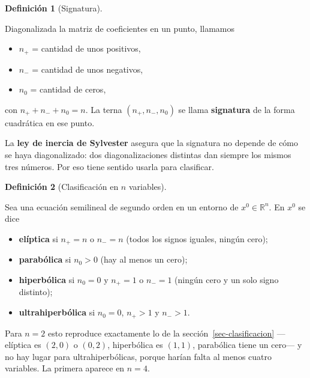 \documentclass[
  spanish,
  a4paper,
]{scrbook}
\providecommand{\tightlist}{%
  \setlength{\itemsep}{0pt}\setlength{\parskip}{0pt}}
\theoremstyle{definition}
\newtheorem{definition}{Definición}[chapter]
\theoremstyle{plain}
\theoremstyle{definition}
\theoremstyle{plain}
\theoremstyle{definition}
\theoremstyle{remark}
\begin{document}
\begin{definition}[Signatura]\protect\hypertarget{def-signatura}{}\label{def-signatura}

Diagonalizada la matriz de coeficientes en un punto, llamamos

\begin{itemize}
\tightlist
\item
  \(n_+\) = cantidad de unos positivos,
\item
  \(n_-\) = cantidad de unos negativos,
\item
  \(n_0\) = cantidad de ceros,
\end{itemize}

con \(n_+ + n_- + n_0 = n\). La terna \((n_+, n_-, n_0)\) se llama
\textbf{signatura} de la forma cuadrática en ese punto.

La \textbf{ley de inercia de Sylvester} asegura que la signatura no
depende de cómo se haya diagonalizado: dos diagonalizaciones distintas
dan siempre los mismos tres números. Por eso tiene sentido usarla para
clasificar.

\end{definition}

\begin{definition}[Clasificación en \(n\)
variables]\protect\hypertarget{def-clasificacion-n}{}\label{def-clasificacion-n}

Sea una ecuación semilineal de segundo orden en un entorno de
\(x^0 \in \mathbb{R}^n\). En \(x^0\) se dice

\begin{itemize}
\tightlist
\item
  \textbf{elíptica} si \(n_+ = n\) o \(n_- = n\) (todos los signos
  iguales, ningún cero);
\item
  \textbf{parabólica} si \(n_0 > 0\) (hay al menos un cero);
\item
  \textbf{hiperbólica} si \(n_0 = 0\) y \(n_+ = 1\) o \(n_- = 1\)
  (ningún cero y un solo signo distinto);
\item
  \textbf{ultrahiperbólica} si \(n_0 = 0\), \(n_+ > 1\) y \(n_- > 1\).
\end{itemize}

\end{definition}

Para \(n=2\) esto reproduce exactamente lo de la
sección~\ref{sec-clasificacion} ---elíptica es \((2,0)\) o \((0,2)\),
hiperbólica es \((1,1)\), parabólica tiene un cero--- y no hay lugar
para ultrahiperbólicas, porque harían falta al menos cuatro variables.
La primera aparece en \(n=4\).
\end{document}
